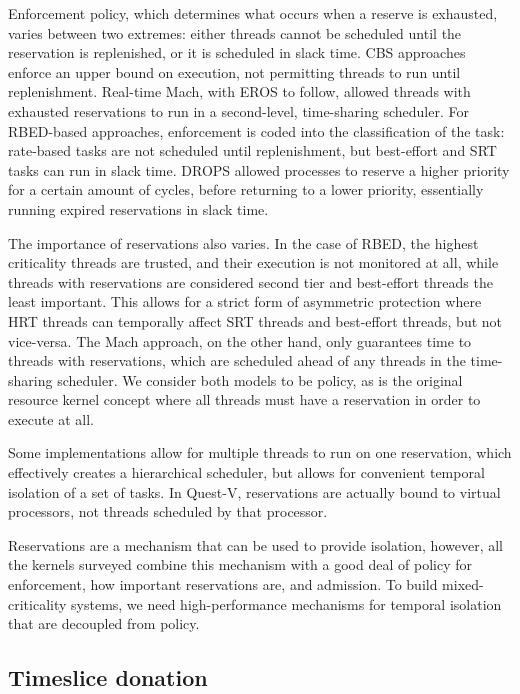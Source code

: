 Enforcement policy, which determines what occurs when a reserve is exhausted,
varies between two extremes: either threads cannot be scheduled until the reservation is
replenished, or it is scheduled in slack time. 
\gls{CBS} approaches enforce an upper bound on execution, not permitting threads to run until 
replenishment. Real-time Mach, with EROS to follow, allowed threads with exhausted reservations to
run in a second-level, time-sharing scheduler. For RBED-based approaches, enforcement is coded into
the classification of the task: rate-based tasks are not scheduled until replenishment, but
best-effort and \gls{SRT} tasks can run in slack time. 
\gls{DROPS} allowed processes to reserve a 
higher priority for a certain amount of cycles, before returning to a lower priority, essentially
running expired reservations in slack time. 

The importance of reservations also varies. In the case of RBED, the highest criticality threads
are trusted, and their execution is not monitored at all, while threads with reservations are
considered second tier and best-effort threads the least important. This allows for a strict form 
of asymmetric protection where \gls{HRT} threads can temporally affect \gls{SRT} threads and
best-effort threads, but not vice-versa. The Mach approach, on the other hand, only guarantees time
to threads with reservations, which are scheduled ahead of any threads in the time-sharing
scheduler. We consider both models to be policy, as is the original resource kernel concept where
all threads must have a reservation in order to execute at all.  

Some implementations allow for multiple threads to run on one reservation, which effectively creates
a hierarchical scheduler, but allows for convenient temporal isolation of a set of tasks. In
Quest-V, reservations are actually bound to virtual processors, not threads scheduled by that
processor. 

Reservations are a mechanism that can be used to provide isolation, however, all the kernels
surveyed combine this mechanism with a good deal of policy for enforcement, how important
reservations are, and admission. To build mixed-criticality systems, we
need high-performance mechanisms for temporal isolation that are decoupled from policy.

\subsection{Timeslice donation}
\label{sec:os-timeslice-donation}

